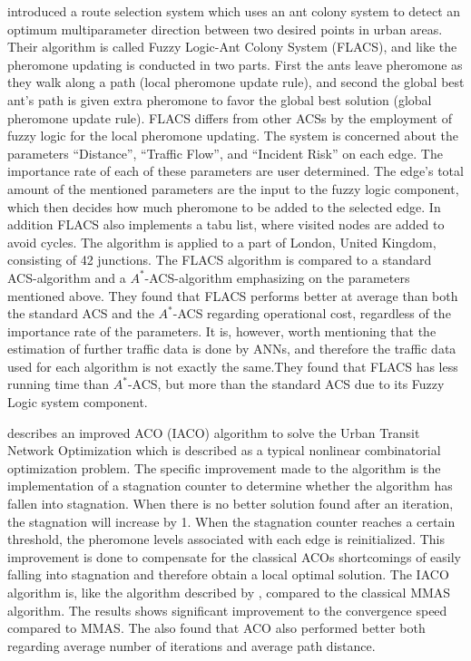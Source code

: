 \citet{salehinejad10} introduced a route selection system which uses an ant colony system to detect an optimum multiparameter direction between two desired points in urban areas. Their algorithm is called Fuzzy Logic-Ant Colony System (FLACS), and like \citet{tripathi09} the pheromone updating is conducted in two parts. First the ants leave pheromone as they walk along a path (local pheromone update rule), and second the global best ant's path is given extra pheromone to favor the global best solution (global pheromone update rule). FLACS differs from other ACSs by the employment of fuzzy logic for the local pheromone updating. The system is concerned about the parameters ``Distance'', ``Traffic Flow'', and ``Incident Risk'' on each edge. The importance rate of each of these parameters are user determined. The edge's total amount of the mentioned parameters are the input to the fuzzy logic component, which then decides how much pheromone to be added to the selected edge. In addition FLACS also implements a tabu list, where visited nodes are added to avoid cycles. The algorithm is applied to a part of London, United Kingdom, consisting of 42 junctions. The FLACS algorithm is compared to a standard ACS-algorithm and a $A^*$-ACS-algorithm emphasizing on the parameters mentioned above. They found that FLACS performs better at average than both the standard ACS and the $A^*$-ACS regarding operational cost, regardless of the importance rate of the parameters. It is, however, worth mentioning that the estimation of further traffic data is done by ANNs, and therefore the traffic data used for each algorithm is not exactly the same.They found that FLACS has less running time than $A^*$-ACS, but more than the standard ACS due to its Fuzzy Logic system component. 

\citet{jiang10} describes an improved ACO (IACO) algorithm to solve the Urban Transit Network Optimization which is described as a typical nonlinear combinatorial optimization problem. The specific improvement made to the algorithm is the implementation of a stagnation counter to determine whether the algorithm has fallen into stagnation. When there is no better solution found after an iteration, the stagnation will increase by 1. When the stagnation counter reaches a certain threshold, the pheromone levels associated with each edge is reinitialized. This improvement is done to compensate for the classical ACOs shortcomings of easily falling into stagnation and therefore obtain a local optimal solution. The IACO algorithm is, like the algorithm described by \citet{yang07}, compared to the classical MMAS algorithm. The results shows significant improvement to the convergence speed compared to MMAS. The also found that ACO also performed better both regarding average number of iterations and average path distance. 

